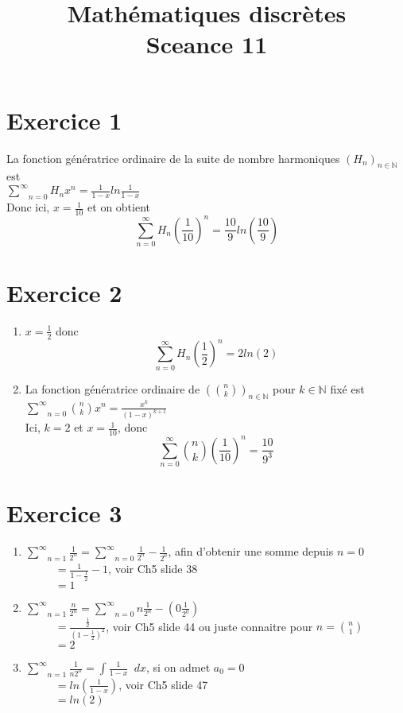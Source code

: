 \documentclass[fontsize=10pt]{article}
\title{\textbf{Mathématiques discrètes}\\ Sceance 11}
\date{}
\newcommand\tab[1][1cm]{\hspace*{#1}}
\begin{document}
\maketitle %

\section*{Exercice 1}
La fonction génératrice ordinaire de la suite de nombre harmoniques $(H_n)_{n\in{\mathbb{N}}}$ est\\
\tab$\underset{n=0}{\overset{\infty}{\sum}} H_n x^n = \frac{1}{1-x}ln\frac{1}{1-x}$\\
Donc ici, $x = \frac{1}{10}$ et on obtient
$$\underset{n=0}{\overset{\infty}{\sum}} H_n \left(\frac{1}{10}\right)^n = \frac{10}{9}ln\left(\frac{10}{9}\right)$$

\section*{Exercice 2}
\begin{enumerate}
\item
$x = \frac{1}{2}$ donc
$$\underset{n=0}{\overset{\infty}{\sum}} H_n \left(\frac{1}{2}\right)^n = 2ln(2)$$
\item
La fonction génératrice ordinaire de $\left(n \choose k \right)_{n\in{\mathbb{N}}}$ pour $k \in{\mathbb{N}}$ fixé est\\
\tab$\underset{n=0}{\overset{\infty}{\sum}} {n \choose k} x^n = \frac{x^k}{(1-x)^{k+1}}$\\
Ici, $k=2$ et $x=\frac{1}{10}$, donc
$$\underset{n=0}{\overset{\infty}{\sum}} {n \choose k} \left(\frac{1}{10}\right)^n = \frac{10}{9^3}$$
\end{enumerate}

\section*{Exercice 3}
\begin{enumerate}
\item
$\underset{n=1}{\overset{\infty}{\sum}} \frac{1}{2^n} = \underset{n=0}{\overset{\infty}{\sum}} \frac{1}{2^n} - \frac{1}{2^0}$, afin d'obtenir une somme depuis $n=0$\\
$\phantom{aaaaa} = \frac{1}{1-\frac{1}{2}} - 1$, voir Ch5 slide 38\\
$\phantom{aaaaa} = 1$
\item
$\underset{n=1}{\overset{\infty}{\sum}} \frac{n}{2^n} = \underset{n=0}{\overset{\infty}{\sum}} n \frac{1}{2^n} - \left(0{\frac{1}{2^0}}\right)$\\
$\phantom{aaaaa} = \frac{\frac{1}{2}}{\left(1-\frac{1}{2}\right)^2}$, voir Ch5 slide 44 ou juste connaitre pour $n = {n \choose 1}$\\
$\phantom{aaaaa} = 2$
\item
$\underset{n=1}{\overset{\infty}{\sum}} \frac{1}{n2^n} = \int\frac{1}{1-x} \phantom{a} dx$, si on admet $a_0 = 0$\\
$\phantom{aaaaa} = ln(\frac{1}{1-x})$, voir Ch5 slide 47\\
$\phantom{aaaaa} = ln(2)$
\end{enumerate}
 
\end{document}

